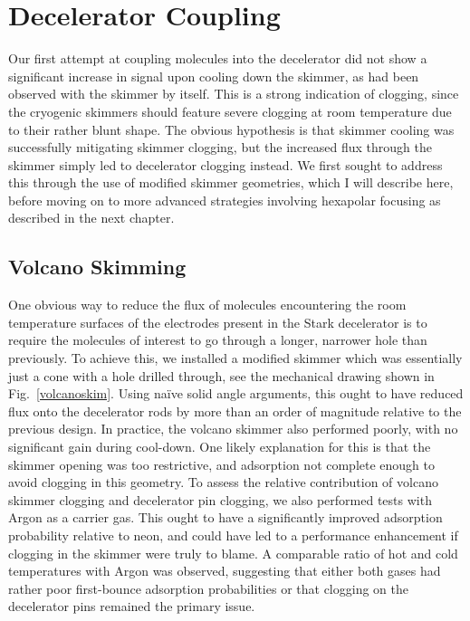 \section{Decelerator Coupling}

Our first attempt at coupling molecules into the decelerator did not show a significant increase in signal upon cooling down the skimmer, as had been observed with the skimmer by itself.
This is a strong indication of clogging, since the cryogenic skimmers should feature severe clogging at room temperature due to their rather blunt shape.
The obvious hypothesis is that skimmer cooling was successfully mitigating skimmer clogging, but the increased flux through the skimmer simply led to decelerator clogging instead.
We first sought to address this through the use of modified skimmer geometries, which I will describe here, before moving on to more advanced strategies involving hexapolar focusing as described in the next chapter.

\subsection{Volcano Skimming}


One obvious way to reduce the flux of molecules encountering the room temperature surfaces of the electrodes present in the Stark decelerator is to require the molecules of interest to go through a longer, narrower hole than previously.
To achieve this, we installed a modified skimmer which was essentially just a cone with a hole drilled through, see the mechanical drawing shown in Fig.~\ref{volcanoskim}.
Using na\"{i}ve solid angle arguments, this ought to have reduced flux onto the decelerator rods by more than an order of magnitude relative to the previous design.
In practice, the volcano skimmer also performed poorly, with no significant gain during cool-down.
One likely explanation for this is that the skimmer opening was too restrictive, and adsorption not complete enough to avoid clogging in this geometry.
To assess the relative contribution of volcano skimmer clogging and decelerator pin clogging, we also performed tests with Argon as a carrier gas.
This ought to have a significantly improved adsorption probability relative to neon, and could have led to a performance enhancement if clogging in the skimmer were truly to blame.
A comparable ratio of hot and cold temperatures with Argon was observed, suggesting that either both gases had rather poor first-bounce adsorption probabilities or that clogging on the decelerator pins remained the primary issue.

